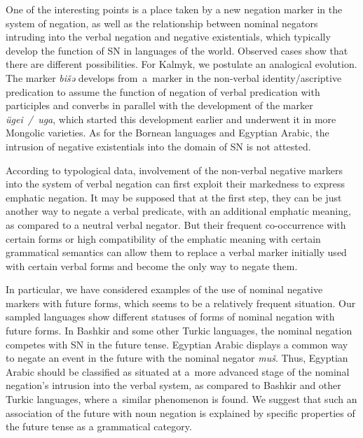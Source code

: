 \documentclass[output=paper]{langsci/langscibook}
\begin{document}
One of the interesting points is a place taken by a new negation marker in the system of negation, as well as the relationship between nominal negators intruding into the verbal negation and negative existentials, which typically develop the function of SN in languages of the world. Observed cases show that there are different possibilities. For Kalmyk, we postulate an analogical evolution. The marker \textit{bišə} develops from a marker in the non-verbal identity/ascriptive predication to assume the function of negation of verbal predication with participles and converbs in parallel with the development of the marker \textit{ügei / uga}, which started this development earlier and underwent it in more Mongolic varieties. As for the Bornean languages and Egyptian Arabic, the intrusion of negative existentials into the domain of SN is not attested.

According to typological data, involvement of the non-verbal negative markers into the system of verbal negation can first exploit their markedness to express emphatic negation. It may be supposed that at the first step, they can be just another way to negate a verbal predicate, with an additional emphatic meaning, as compared to a neutral verbal negator. But their frequent co-occurrence with certain forms or high compatibility of the emphatic meaning with certain grammatical semantics can allow them to replace a verbal marker initially used with certain verbal forms and become the only way to negate them.

In particular, we have considered examples of the use of nominal negative markers with future forms, which seems to be a relatively frequent situation. Our sampled languages show different statuses of forms of nominal negation with future forms. In Bashkir and some other Turkic languages, the nominal negation competes with SN in the future tense. Egyptian Arabic displays a common way to negate an event in the future with the nominal negator \textit{muš}. Thus, Egyptian Arabic should be classified as situated at a more advanced stage of the nominal negation’s intrusion into the verbal system, as compared to Bashkir and other Turkic languages, where a similar phenomenon is found. We suggest that such an association of the future with noun negation is explained by specific properties of the future tense as a grammatical category.
 
\end{document}
